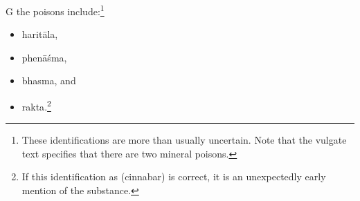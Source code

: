\begin{translation}
        \item[G]
        the   poisons include:\footnote{These identifications
            are more than usually uncertain.  Note that the vulgate
            text specifies that there are two mineral poisons.}
              \begin{itemize}
\item \gls{haritāla},
\item \gls{phenāśma}, 
\item \gls{bhasma}, and
\item \gls{rakta}.\footnote{If this identification as  (cinnabar) is 
correct, it is an unexpectedly early mention of the substance.}        
            \end{itemize}



\end{translation}
